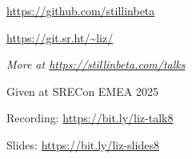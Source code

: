 \documentclass[letterpaper,11pt,notitlepage]{article}
\begin{document}
        \begin{employment}
           \item \url{https://github.com/stillinbeta}
        \end{employment}
        \begin{employment}
           \item \url{https://git.sr.ht/~liz/}
        \end{employment}
\vbar
{}
      {\it More at \url{https://stillinbeta.com/talks}} \\
      \begin{employment}
          \item Given at SRECon EMEA 2025
          \item Recording: \url{https://bit.ly/liz-talk8}
          \item Slides: \url{https://bit.ly/liz-slides8}
      \end{employment}
\end{document}
